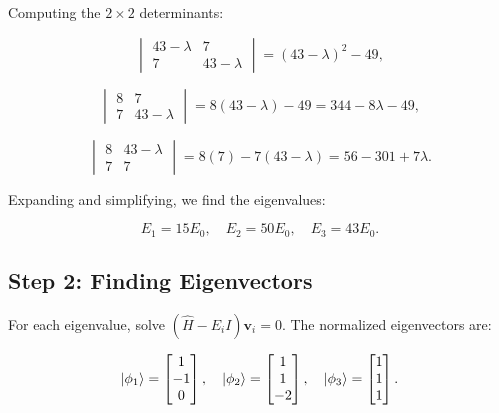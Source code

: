 \documentclass[12pt]{article}
\begin{document}
Computing the $2 \times 2$ determinants:

\begin{equation}
    \begin{vmatrix} 43 - \lambda & 7 \\ 7 & 43 - \lambda \end{vmatrix} = (43 - \lambda)^2 - 49,
\end{equation}

\begin{equation}
    \begin{vmatrix} 8 & 7 \\ 7 & 43 - \lambda \end{vmatrix} = 8(43 - \lambda) - 49 = 344 - 8\lambda - 49,
\end{equation}

\begin{equation}
    \begin{vmatrix} 8 & 43 - \lambda \\ 7 & 7 \end{vmatrix} = 8(7) - 7(43 - \lambda) = 56 - 301 + 7\lambda.
\end{equation}

Expanding and simplifying, we find the eigenvalues:

\begin{equation}
    E_1 = 15E_0, \quad E_2 = 50E_0, \quad E_3 = 43E_0.
\end{equation}

\subsection*{Step 2: Finding Eigenvectors}
For each eigenvalue, solve $(\hat{H} - E_i I) \mathbf{v}_i = 0$. The normalized eigenvectors are:

\begin{equation}
    \ket{\phi_1} = \begin{bmatrix} 1 \\ -1 \\ 0 \end{bmatrix}, \quad
    \ket{\phi_2} = \begin{bmatrix} 1 \\ 1 \\ -2 \end{bmatrix}, \quad
    \ket{\phi_3} = \begin{bmatrix} 1 \\ 1 \\ 1 \end{bmatrix}.
\end{equation}
\end{document}
